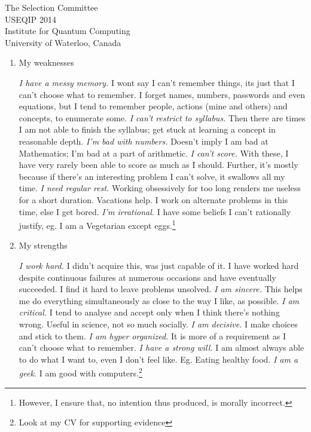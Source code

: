 \documentclass{letter}
\begin{document}
\begin{letter}{The Selection Committee\\USEQIP 2014\\Institute for Quantum Computing\\University of Waterloo, Canada}
\begin{enumerate}

\item My weaknesses

\emph{I have a messy memory.} I wont say I can't remember things, its just that I can't choose what to remember. I forget names, numbers, passwords and even equations, but I tend to remember people, actions (mine and others) and concepts, to enumerate some.
\emph{I can't restrict to syllabus.} Then there are times I am not able to finish the syllabus; get stuck at learning a concept in reasonable depth.
\emph{I'm bad with numbers.} Doesn't imply I am bad at Mathematics; I'm bad at a part of arithmetic.
\emph{I can't score.} With these, I have very rarely been able to score as much as I should. Further, it's mostly because if there's an interesting problem I can't solve, it swallows all my time. 
\emph{I need regular rest.} Working obsessively for too long renders me useless for a short duration. Vacations help. I work on alternate problems in this time, else I get bored.
\emph{I'm irrational.} I have some beliefs I can't rationally justify, eg. I am a Vegetarian except eggs.\footnote{However, I ensure that, no intention thus produced, is morally incorrect.}

\item My strengths

\emph{I work hard.} I didn't acquire this, was just capable of it. I have worked hard despite continuous failures at numerous occasions and have eventually succeeded. I find it hard to leave problems unsolved.
\emph{I am sincere.} This helps me do everything simultaneously as close to the way I like, as possible.
\emph{I am critical.} I tend to analyse and accept only when I think there's nothing wrong. Useful in science, not so much socially.
\emph{I am decisive.} I make choices and stick to them.
\emph{I am hyper organized.} It is more of a requirement as I can't choose what to remember.
\emph{I have a strong will.} I am almost always able to do what I want to, even I don't feel like. Eg. Eating healthy food.
\emph{I am a geek.} I am good with computers.\footnote{Look at my CV for supporting evidence}



\end{enumerate}
\end{letter}
\end{document}
